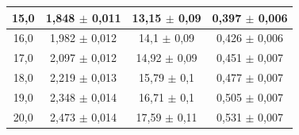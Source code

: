 \documentclass[a4paper,11pt]{article}
\begin{document}
\begin{tabular}{|c|c|c|c|}
\hline
15,0   & 	1,848 $\pm$  0,011     &   13,15 $\pm$  0,09	 &   0,397 $\pm$  0,006\\
\hline
16,0   & 	1,982 $\pm$  0,012     &   14,1  $\pm$  0,09	 &   0,426 $\pm$  0,006\\
\hline
17,0   & 	2,097 $\pm$  0,012     &   14,92 $\pm$  0,09	 &   0,451 $\pm$  0,007\\
\hline
18,0   & 	2,219 $\pm$  0,013     &   15,79 $\pm$  0,1	 &   0,477 $\pm$  0,007\\
\hline
19,0   & 	2,348 $\pm$  0,014     &   16,71 $\pm$  0,1	 &   0,505 $\pm$  0,007\\
\hline
20,0   & 	2,473 $\pm$  0,014     &   17,59 $\pm$  0,11	 &   0,531 $\pm$  0,007\\
\hline
\end{tabular}


 

\nocite{Quintero2018}
\nocite{Zetina2000}
\end{document}
